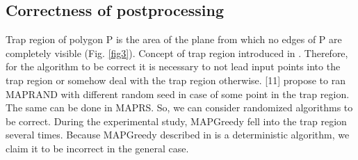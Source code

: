 \documentclass[conference]{IEEEtran}
\begin{document}
		\subsection {Correctness of postprocessing}
			Trap region of polygon P is the area of the plane from which no edges of P are completely visible (Fig. \ref{fig3}).
			Concept of trap region introduced in \cite{link11}.
			Therefore, for the algorithm to be correct it is necessary to not lead input points into the trap region or somehow deal with the trap region otherwise.
			[11] propose to ran MAP{\textunderscore}RAND with different random seed in case of some point in the trap region.
			The same can be done in MAP{\textunderscore}RS.
			So, we can consider randomized algorithms to be correct.
			During the experimental study, MAP{\textunderscore}Greedy fell into the trap region several times.
			Because MAP{\textunderscore}Greedy described in \cite{link8} is a deterministic algorithm, we claim it to be incorrect in the general case.
			
\end{document}
